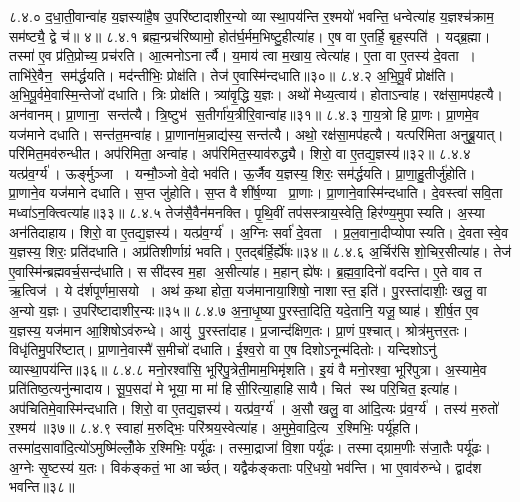 ८.४.०
द॒धा॒ती॒वान्वा॑ह य॒ज्ञस्या॑है॒ष उ॒परि॑ष्टादाशीर॒न्यो व्यास्था॒पय॑न्ति र॒श्मयो॑ भवन्ति॒ धन्वेत्या॑ह य॒ज्ञश्च॑क्राम॒ सम॑ष्ट्यै॒ द्वे च॑॥ ४॥
८.४.१
ब्रह्म॒न्प्रच॑रिष्यामो॒ होत॑र्घ॒र्मम॒भिष्टु॒हीत्या॑ह। ए॒ष वा ए॒तर्\mbox{}हि॒ बृह॒स्पति॑। यद्ब्र॒ह्मा। तस्मा॑ ए॒व प्र॑ति॒प्रोच्य॒ प्रच॑रति। आ॒त्मनोऽनार्त्यै। य॒माय॑ त्वा म॒खाय॒ त्वेत्या॑ह। ए॒ता वा ए॒तस्य॑ दे॒वता। ताभि॑रे॒वैन॒ सम॑र्द्धयति। मद॑न्तीभिः॒ प्रोक्ष॑ति। तेज॑ ए॒वास्मि॑न्दधाति॥३०॥
८.४.२
अ॒भि॒पू॒र्वं प्रोक्ष॑ति। अ॒भि॒पू॒र्वमे॒वास्मि॒न्तेजो॑ दधाति। त्रिः प्रोक्ष॑ति। त्र्या॑वृ॒द्धि य॒ज्ञः। अथो॑ मेध्य॒त्वाय॑। होताऽन्वा॑ह। रक्ष॑सा॒मप॑हत्यै। अन॑वानम्। प्रा॒णाना॒ सन्त॑त्यै। त्रि॒ष्टुभ॑ स॒तीर्गा॑य॒त्रीरि॒वान्वा॑ह॥३१॥
८.४.३
गा॒य॒त्रो हि प्रा॒णः। प्रा॒णमे॒व यज॑माने दधाति। सन्त॑त॒मन्वा॑ह। प्रा॒णाना॑म॒न्नाद्य॑स्य॒ सन्त॑त्यै। अथो॒ रक्ष॑सा॒मप॑हत्यै। यत्परि॑मिता अनुब्रू॒यात्। परि॑मित॒मव॑रुन्धीत। अप॑रिमिता॒ अन्वा॑ह। अप॑रिमित॒स्याव॑रुद्ध्यै। शिरो॒ वा ए॒तद्य॒ज्ञस्य॑॥३२॥
८.४.४
यत्प्र॑व॒र्ग्य॑। ऊर्ङ्मुञ्जा। यन्मौ॒ञ्जो वे॒दो भव॑ति। ऊ॒र्जैव य॒ज्ञस्य॒ शिरः॒ सम॑र्द्धयति। प्रा॒णा॒हु॒तीर्जु॑होति। प्रा॒णाने॒व यज॑माने दधाति। स॒प्त जु॑होति। स॒प्त वै शी॑र्\mbox{}ष॒ण्या प्रा॒णाः। प्रा॒णाने॒वास्मि॑न्दधाति। दे॒वस्त्वा॑ सवि॒ता मध्वा॑ऽन॒क्त्वित्या॑ह॥३३॥
८.४.५
तेज॑सै॒वैन॑मनक्ति। पृ॒थि॒वीं तप॑सस्त्राय॒स्वेति॒ हिर॑ण्य॒मुपास्यति। अ॒स्या अन॑तिदाहाय। शिरो॒ वा ए॒तद्य॒ज्ञस्य॑। यत्प्र॑व॒र्ग्य॑। अ॒ग्निः सर्वा॑ दे॒वता। प्र॒ल॒वाना॒दीप्योपास्यति। दे॒वतास्वे॒व य॒ज्ञस्य॒ शिरः॒ प्रति॑दधाति। अप्र॑तिशीर्णाग्रं भवति। ए॒तद्ब॑र्\mbox{}हि॒र्\mbox{}ह्ये॑षः॥३४॥
८.४.६
अ॒र्चिर॑सि शो॒चिर॒सीत्या॑ह। तेज॑ ए॒वास्मि॑न्ब्रह्मवर्च॒सन्द॑धाति। ससी॑दस्व म॒हा अ॒सीत्या॑ह। म॒हान् ह्ये॑षः। ब्र॒ह्म॒वा॒दिनो॑ वदन्ति। ए॒ते वाव त ऋ॒त्विज॑। ये द॑र्\mbox{}शपूर्णमा॒सयो। अथ॑ क॒था होता॒ यज॑मानाया॒शिषो॒ नाशास्त॒ इति॑। पु॒रस्ता॑दाशीः॒ खलु॒ वा अ॒न्यो य॒ज्ञः। उ॒परि॑ष्टादाशीर॒न्यः॥३५॥
८.४.७
अ॒ना॒धृ॒ष्या पु॒रस्ता॒दिति॒ यदे॒तानि॒ यजू॒ष्याह॑। शी॒र्\mbox{}ष॒त ए॒व य॒ज्ञस्य॒ यज॑मान आ॒शिषोऽव॑रुन्धे। आयु॑ पु॒रस्ता॑दाह। प्र॒जान्द॑क्षिण॒तः। प्रा॒णं प॒श्चात्। श्रोत्र॑मुत्तर॒तः। विधृ॑तिमु॒परि॑ष्टात्। प्रा॒णाने॒वास्मै॑ स॒मीचो॑ दधाति। ई॒श्व॒रो वा ए॒ष दिशोऽनून्म॑दितोः। यन्दिशोऽनु॑ व्यास्था॒पय॑न्ति॥३६॥
८.४.८
मनो॒रश्वा॑सि॒ भूरि॑पु॒त्रेती॒माम॒भिमृ॑शति। इ॒यं वै मनो॒रश्वा॒ भूरि॑पुत्रा। अ॒स्यामे॒व प्रति॑तिष्ठ॒त्यनु॑न्मादाय। सू॒प॒सदा॑ मे भूया॒ मा मा॑ हिसी॒रित्या॒हाहिसायै। चित॑ स्थ परि॒चित॒ इत्या॑ह। अप॑चितिमे॒वास्मि॑न्दधाति। शिरो॒ वा ए॒तद्य॒ज्ञस्य॑। यत्प्र॑व॒र्ग्य॑। अ॒सौ खलु॒ वा आ॑दि॒त्यः प्र॑व॒र्ग्य॑। तस्य॑ म॒रुतो॑ र॒श्मय॑॥३७॥
८.४.९
स्वाहा॑ म॒रुद्भिः॒ परि॑श्रय॒स्वेत्या॑ह। अ॒मुमे॒वादि॒त्य र॒श्मिभिः॒ पर्यू॑हति। तस्मा॑द॒सावा॑दि॒त्यो॑ऽमुष्मि॑ल्लोँ॒के र॒श्मिभिः॒ पर्यू॑ढः। तस्मा॒द्राजा॑ वि॒शा पर्यू॑ढः। तस्माद्ग्राम॒णीः स॑जा॒तैः पर्यू॑ढः। अ॒ग्नेः सृ॒ष्टस्य॑ य॒तः। विक॑ङ्कतं॒ भा आर्च्छत्। यद्वैक॑ङ्कताः परि॒धयो॒ भव॑न्ति। भा ए॒वाव॑रुन्धे। द्वाद॑श भवन्ति॥३८॥
